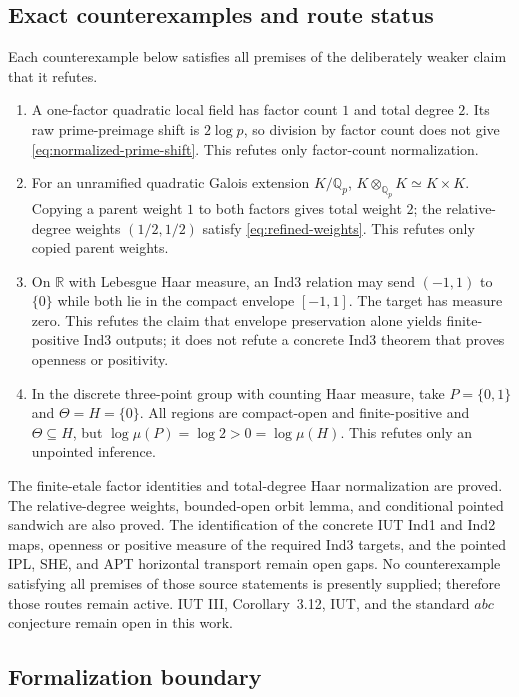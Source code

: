 \subsection{Exact counterexamples and route status}

Each counterexample below satisfies all premises of the deliberately weaker
claim that it refutes.

\begin{enumerate}
\item A one-factor quadratic local field has factor count $1$ and total
degree $2$.  Its raw prime-preimage shift is $2\log p$, so division by factor
count does not give \eqref{eq:normalized-prime-shift}.  This refutes only
factor-count normalization.
\item For an unramified quadratic Galois extension $K/\mathbb Q_p$,
$K\otimes_{\mathbb Q_p}K\simeq K\times K$.  Copying a parent weight $1$ to
both factors gives total weight $2$; the relative-degree weights
$(1/2,1/2)$ satisfy \eqref{eq:refined-weights}.  This refutes only copied
parent weights.
\item On $\mathbb R$ with Lebesgue Haar measure, an Ind3 relation may send
$(-1,1)$ to $\{0\}$ while both lie in the compact envelope $[-1,1]$.
The target has measure zero.  This refutes the claim that envelope
preservation alone yields finite-positive Ind3 outputs; it does not refute a
concrete Ind3 theorem that proves openness or positivity.
\item In the discrete three-point group with counting Haar measure, take
$P=\{0,1\}$ and $\Theta=H=\{0\}$.  All regions are compact-open and
finite-positive and $\Theta\subseteq H$, but
$\log\mu(P)=\log2>0=\log\mu(H)$.  This refutes only an unpointed inference.
\end{enumerate}

The finite-etale factor identities and total-degree Haar normalization are
proved.  The relative-degree weights, bounded-open orbit lemma, and
conditional pointed sandwich are also proved.  The identification of the
concrete IUT Ind1 and Ind2 maps,
openness or positive measure of the required Ind3 targets, and the pointed
IPL, SHE, and APT horizontal transport remain open gaps.  No counterexample
satisfying all premises of those source statements is presently supplied;
therefore those routes remain active.  IUT III, Corollary~3.12, IUT, and the
standard $abc$ conjecture remain open in this work.

\subsection{Formalization boundary}

